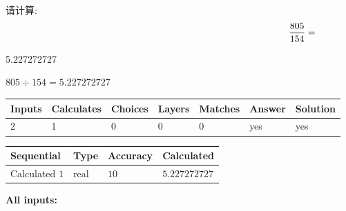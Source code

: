 \documentclass{ctexart}
\begin{document}
  
 
请计算:
\begin{equation}
\frac { %
805 }  {  %
154} = \nonumber
\end{equation}
 
 
 
\noindent{}
 
 

5.227272727
 
 
\noindent{}
 
 

 
 
 
\noindent{}
 
 

$ %
805 \div  %
154=   %
5.227272727$
 
 
\noindent{}
 
 

 
   
   
   
   
\noindent\begin{tabular}{|l|l|l|l|l|l|l|}
 \hline
Inputs & Calculates & Choices & Layers & Matches & Answer & Solution \\ \hline
 2  & 
 1  & 
 0
  & 
 0  & 
 0  & 
  yes & 
  yes 
  \\ \hline
 \end{tabular}
   
   
   
   
\noindent{}
   
   
  
  
\noindent\begin{tabular}{|l|l|l|l|}
\hline
 Sequential & Type & Accuracy & Calculated \\ 
\hline
 
 
  Calculated $  1 $ & real & $  10  $ & 
 $ 5.227272727 $ 
 \\  \hline  
 \end{tabular}
   
   
   
   
\noindent\vspace{0.1in}\hspace{-0.08in} {\textbf{\Large{All inputs: }}}
   
\end{document}
